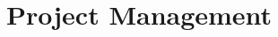 \documentclass[a4paper,12pt]{article}
\begin{document}

\newpage
\section{Project Management}
\label{sec:project_management}


\newpage


\end{document}
